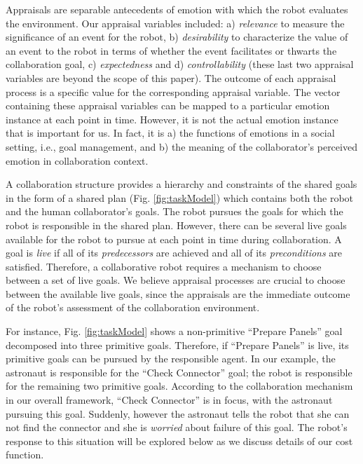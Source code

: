 \documentclass[conference]{IEEEtran}
\begin{document}
Appraisals are separable antecedents of emotion with which the robot
evaluates the environment. Our appraisal variables included: a)
\textit{relevance} to measure the significance of an event for the robot, b)
\textit{desirability} to characterize the value of an event to the robot in
terms of whether the event facilitates or thwarts the collaboration goal, c)
\textit{expectedness} and d) \textit{controllability} (these last two appraisal
variables are beyond the scope of this paper). The outcome of each appraisal
process is a specific value for the corresponding appraisal variable. The vector
containing these appraisal variables can be mapped to a particular emotion
instance at each point in time. However, it is not the actual emotion instance
that is important for us. In fact, it is a) the functions of emotions in a
social setting, i.e., goal management, and b) the meaning of the collaborator's
perceived emotion in collaboration context.

A collaboration structure provides a hierarchy and constraints of the shared
goals in the form of a shared plan (Fig. \ref{fig:taskModel}) which contains
both the robot and the human collaborator's goals. The robot pursues the goals
for which the robot is responsible in the shared plan. However, there can be
several live goals available for the robot to pursue at each point in time
during collaboration. A goal is \textit{live} if all of its
\textit{predecessors} are achieved and all of its \textit{preconditions} are
satisfied. Therefore, a collaborative robot requires a mechanism to choose
between a set of live goals. We believe appraisal processes are crucial to
choose between the available live goals, since the appraisals are the immediate
outcome of the robot's assessment of the collaboration environment.

For instance, Fig. \ref{fig:taskModel} shows a non-primitive ``Prepare Panels''
goal decomposed into three primitive goals. Therefore, if ``Prepare Panels'' is
live, its primitive goals can be pursued by the responsible agent. In our
example, the astronaut is responsible for the ``Check Connector'' goal; the
robot is responsible for the remaining two primitive goals. According to the
collaboration mechanism in our overall framework, ``Check Connector'' is in
focus, with the astronaut pursuing this goal. Suddenly, however the astronaut
tells the robot that she can not find the connector and she is \textit{worried}
about failure of this goal. The robot's response to this situation will be
explored below as we discuss details of our cost function.
\end{document}
